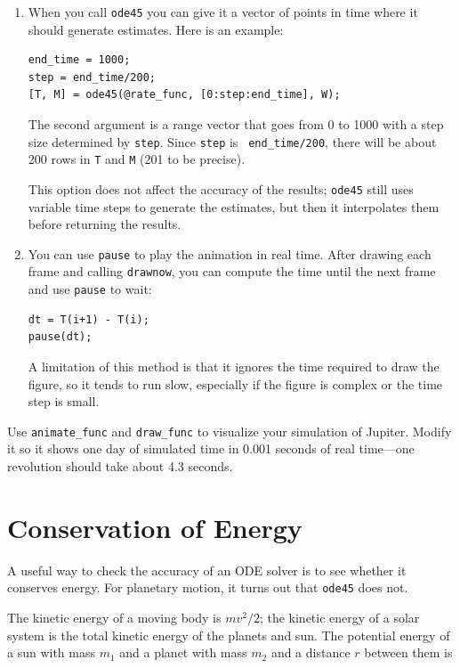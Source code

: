 \documentclass[
]{book}
\begin{document}
\begin{enumerate}

\item When you call {\tt ode45} you can give it a vector of
points in time where it should generate estimates.  Here is
an example:

\begin{verbatim}
end_time = 1000;
step = end_time/200;
[T, M] = ode45(@rate_func, [0:step:end_time], W);
\end{verbatim}

The second argument is a range vector that goes from 0 to 1000 with a
step size determined by {\tt step}.  Since {\tt step} is {\tt
end\_time/200}, there will be about 200 rows in {\tt T} and {\tt M}
(201 to be precise).

This option does not affect the accuracy of the results; {\tt ode45}
still uses variable time steps to generate the estimates, but then it
interpolates them before returning the results.

\item You can use {\tt pause} to play the animation in
real time.  After drawing each frame and calling
{\tt drawnow}, you can compute the time
until the next frame and use {\tt pause} to wait:

\begin{verbatim}
dt = T(i+1) - T(i);
pause(dt);
\end{verbatim}

A limitation of this method is that it ignores the time required to
draw the figure, so it tends to run slow, especially if the figure is
complex or the time step is small.

\end{enumerate}

\begin{ex}
Use {\tt animate\_func} and {\tt draw\_func} to visualize your
simulation of Jupiter.  Modify it so it shows one day of simulated
time in 0.001 seconds of real time---one revolution should take
about 4.3 seconds.
\end{ex}


\section{Conservation of Energy}

A useful way to check the accuracy of an ODE solver is to
see whether it conserves energy.  For planetary
motion, it turns out that {\tt ode45} does not.

The kinetic energy of a moving body is $m v^2 / 2$; the
kinetic energy of a solar system is the total kinetic
energy of the planets and sun.
The potential energy of a sun with mass $m_1$ and a
planet with mass $m_2$ and a distance $r$ between them is
\end{document}
